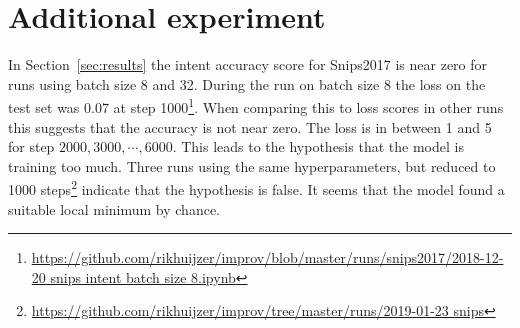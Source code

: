 \section{Additional experiment}
\label{sec:additional_experiments}
In Section~\ref{sec:results} the intent accuracy score for Snips2017 is near zero for runs using batch size 8 and 32.
During the run on batch size 8 the loss on the test set was 0.07 at step 1000\footnote{\url{https://github.com/rikhuijzer/improv/blob/master/runs/snips2017/2018-12-20 snips intent batch size 8.ipynb}}.
When comparing this to loss scores in other runs this suggests that the accuracy is not near zero.
The loss is in between 1 and 5 for step $2000, 3000, \cdots, 6000$.
This leads to the hypothesis that the model is training too much.
Three runs using the same hyperparameters, but reduced to 1000 steps\footnote{\url{https://github.com/rikhuijzer/improv/tree/master/runs/2019-01-23 snips}} indicate that the hypothesis is false.
It seems that the model found a suitable local minimum by chance.
